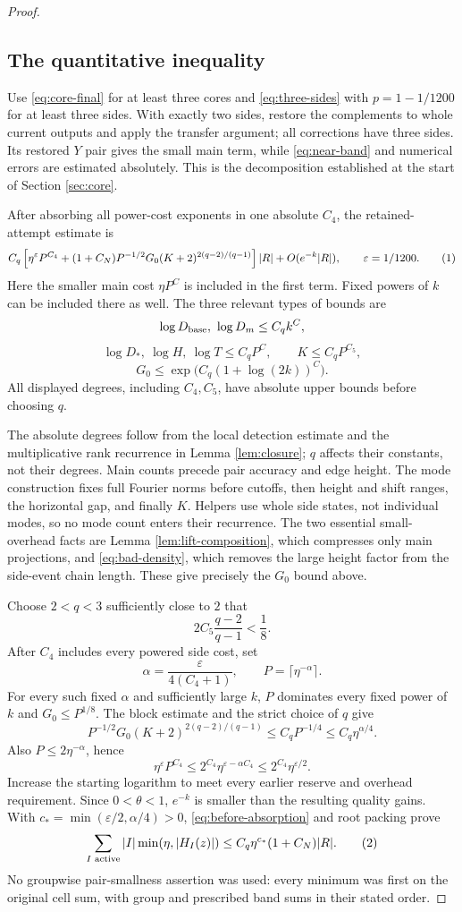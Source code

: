\documentclass[11pt]{article}
\theoremstyle{definition}
\newcommand{\eqtag}[1]{\refstepcounter{equation}\tag{\theequation}\label{#1}}
\numberwithin{equation}{section}
\begin{document}
\begin{proof}
\subsection*{The quantitative inequality}
Use \eqref{eq:core-final} for at least three cores and \eqref{eq:three-sides} with $p=1-1/1200$ for at least three sides. With exactly two sides, restore the complements to whole current outputs and apply the transfer argument; all corrections have three sides. Its restored $Y$ pair gives the small main term, while \eqref{eq:near-band} and numerical errors are estimated absolutely. This is the decomposition established at the start of Section \ref{sec:core}.

After absorbing all power-cost exponents in one absolute $C_4$, the retained-attempt estimate is
\[
 C_q\left[\eta^\varepsilon P^{C_4}
 +(1+C_N)P^{-1/2}G_0(K+2)^{2(q-2)/(q-1)}\right]|R|
 +O(e^{-k}|R|),\qquad \varepsilon=1/1200.
 \eqtag{eq:before-absorption}
\]
Here the smaller main cost $\eta P^C$ is included in the first term. Fixed powers of $k$ can be included there as well. The three relevant types of bounds are
\[
 \log D_{\rm base},\ \log D_m\le C_qk^C,
\]
\[
 \log D_*,\ \log H,\ \log T\le C_qP^C,
 \qquad K\le C_qP^{C_5},
\]
\[
 G_0\le\exp\bigl(C_q(1+\log(2k))^C\bigr).
\]
All displayed degrees, including $C_4,C_5$, have absolute upper bounds before choosing $q$.

The absolute degrees follow from the local detection estimate and the multiplicative rank recurrence in Lemma \ref{lem:closure}; $q$ affects their constants, not their degrees. Main counts precede pair accuracy and edge height. The mode construction fixes full Fourier norms before cutoffs, then height and shift ranges, the horizontal gap, and finally $K$. Helpers use whole side states, not individual modes, so no mode count enters their recurrence. The two essential small-overhead facts are Lemma \ref{lem:lift-composition}, which compresses only main projections, and \eqref{eq:bad-density}, which removes the large height factor from the side-event chain length. These give precisely the $G_0$ bound above.

Choose $2<q<3$ sufficiently close to $2$ that
\[
 2C_5\frac{q-2}{q-1}<\frac18.
\]
After $C_4$ includes every powered side cost, set
\[
 \alpha=\frac{\varepsilon}{4(C_4+1)},\qquad P=\lceil\eta^{-\alpha}\rceil.
\]
For every such fixed $\alpha$ and sufficiently large $k$, $P$ dominates every fixed power of $k$ and $G_0\le P^{1/8}$. The block estimate and the strict choice of $q$ give
\[
 P^{-1/2}G_0(K+2)^{2(q-2)/(q-1)}\le C_qP^{-1/4}\le C_q\eta^{\alpha/4}.
\]
Also $P\le2\eta^{-\alpha}$, hence
\[
 \eta^\varepsilon P^{C_4}\le2^{C_4}\eta^{\varepsilon-\alpha C_4}
 \le2^{C_4}\eta^{\varepsilon/2}.
\]
Increase the starting logarithm to meet every earlier reserve and overhead requirement. Since $0<\theta<1$, $e^{-k}$ is smaller than the resulting quality gains. With $c_* =\min(\varepsilon/2,\alpha/4)>0$, \eqref{eq:before-absorption} and root packing prove
\[
 \sum_{I\text{ active}}|I|\min(\eta,|H_I(z)|)
 \le C_q\eta^{c_*}(1+C_N)|R|.
 \eqtag{eq:active-final}
\]
No groupwise pair-smallness assertion was used: every minimum was first on the original cell sum, with group and prescribed band sums in their stated order.


\end{proof}
\end{document}
